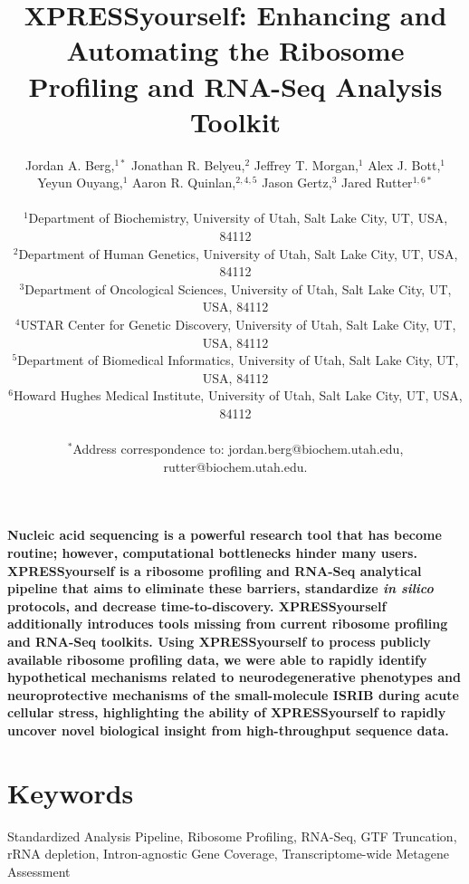 \documentclass[10pt, oneside]{article}
\title{
XPRESSyourself: Enhancing and Automating the Ribosome Profiling and RNA-Seq Analysis Toolkit
}
\author{
Jordan A. Berg,$^{1\ast}$ Jonathan R. Belyeu,$^{2}$ Jeffrey T. Morgan,$^{1}$ Alex J. Bott,$^{1}$ \\
Yeyun Ouyang,$^{1}$ Aaron R. Quinlan,$^{2,4,5}$ Jason Gertz,$^{3}$ Jared Rutter$^{1,6\ast}$ \\
\\
\normalsize{$^{1}$Department of Biochemistry, University of Utah, Salt Lake City, UT, USA, 84112}\\
\normalsize{$^{2}$Department of Human Genetics, University of Utah, Salt Lake City, UT, USA, 84112}\\
\normalsize{$^{3}$Department of Oncological Sciences, University of Utah, Salt Lake City, UT, USA, 84112}\\
\normalsize{$^{4}$USTAR Center for Genetic Discovery, University of Utah, Salt Lake City, UT, USA, 84112}\\
\normalsize{$^{5}$Department of Biomedical Informatics, University of Utah, Salt Lake City, UT, USA, 84112}\\
\normalsize{$^{6}$Howard Hughes Medical Institute, University of Utah, Salt Lake City, UT, USA, 84112}\\
\\
\normalsize{$^\ast$Address correspondence to: jordan.berg@biochem.utah.edu, rutter@biochem.utah.edu.}\\
}
\date{}
\begin{document}
\baselineskip24pt

\maketitle

\textbf{Nucleic acid sequencing is a powerful research tool that has become routine; however, computational bottlenecks hinder many users. XPRESSyourself is a ribosome profiling and RNA-Seq analytical pipeline that aims to eliminate these barriers, standardize \textit{in silico} protocols, and decrease time-to-discovery. XPRESSyourself additionally introduces tools missing from current ribosome profiling and RNA-Seq toolkits. Using XPRESSyourself to process publicly available ribosome profiling data, we were able to rapidly identify hypothetical mechanisms related to neurodegenerative phenotypes and neuroprotective mechanisms of the small-molecule ISRIB during acute cellular stress, highlighting the ability of XPRESSyourself to rapidly uncover novel biological insight from high-throughput sequence data.}

\setlength{\parindent}{2em}

\section*{Keywords}
Standardized Analysis Pipeline, Ribosome Profiling, RNA-Seq, GTF Truncation, rRNA depletion, Intron-agnostic Gene Coverage, Transcriptome-wide Metagene Assessment
\end{document}
